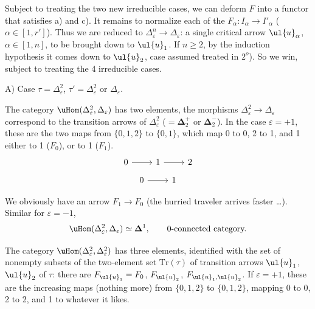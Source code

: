 Subject to treating the two new irreducible cases, we can deform $F$ into a functor that satisfies a) and c). It remains to normalize each of the $F_\alpha:I_\alpha\longrightarrow I'_\alpha$ ($\alpha\in[1,r']$). Thus we are reduced to $\Delta^n_\varepsilon\longrightarrow\Delta_\varepsilon$: a single critical arrow $\ul{u}_\alpha$, $\alpha\in[1,n]$, to be brought down to $\ul{u}_1$. If $n\geq2$, by the induction hypothesis it comes down to $\ul{u}_2$, case assumed treated in $2^o$). So
we win, subject to treating the 4 irreducible cases.

A) Case $\tau=\Delta^2_\varepsilon$, $\tau'=\Delta^2_\varepsilon$ or $\Delta_\varepsilon$.

The category $\uHom(\Delta^2_\varepsilon,\Delta_\varepsilon)$ has two elements, the morphisms $\Delta^2_\varepsilon\longrightarrow\Delta_\varepsilon$ correspond to the transition arrows of $\Delta^2_\varepsilon$ ($=\mathbf{\Delta}^+_2$ or $\mathbf{\Delta}^-_2$). In the case $\varepsilon=+1$, these are the two maps from $\{0,1,2\}$ to $\{0,1\}$, which map 0 to 0, 2 to 1, and 1 either to 1 ($F_0$), or to 1 ($F_1$).
\[
\begin{tikzcd}
0 \arrow[r] & 1 \arrow[r] & 2
\end{tikzcd}
\]
\[
\begin{tikzcd}
0 \arrow[r] & 1
\end{tikzcd}
\]

We obviously have an arrow $F_1\longrightarrow F_0$ (the hurried traveler arrives faster \ldots). Similar for $\varepsilon=-1$,
\[
\uHom(\Delta^2_\varepsilon,\Delta_\varepsilon)\simeq\mathbf{\Delta}^1,\qquad\text{0-connected category.}
\]

The category $\uHom(\Delta^2_\varepsilon,\Delta^2_\varepsilon)$ has three elements, identified with the set of nonempty subsets of the two-element set $\mathrm{Tr}(\tau)$ of transition arrows $\ul{u}_1$, $\ul{u}_2$ of $\tau$: there are $F_{\ul{u}_1}=F_0$, $F_{\ul{u}_2}$, $F_{\ul{u}_1,\ul{u}_2}$. If $\varepsilon=+1$, these are the increasing maps (nothing more) from $\{0,1,2\}$ to $\{0,1,2\}$, mapping 0 to 0, 2 to 2, and 1 to whatever it likes. %